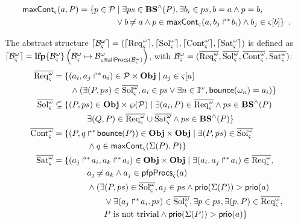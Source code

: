 \begin{definition}[$\gCont_\ctx : \Sigma \times \Obj \mapsto \powerset(\Proc)$]
  \label{def:maxCont}
  \begin{align*}
    \mathsf{maxCont}_\varsigma(a,P) = 
    \{ p \in \mathcal{P} &\mid \exists ps \in \mathbf{BS}^\wedge(P), \exists b_i \in ps, b = a \wedge p = b_i \\
      & \vee b \not\nobreak\mkern -2mu = a \wedge p \in \mathsf{maxCont}_\varsigma(a, \mbox{$b_j\Rsh^*\!b_i$}) \wedge b_j \in {\varsigma[b]} \}
    \enspace.
  \end{align*}
\end{definition}

\begin{definition}
  \label{def:aS}
  The abstract structure $\lceil \mathcal{B}_\varsigma^\omega\rceil=(\lceil \mathrm{Req}^\omega_\varsigma\rceil,\lceil \mathrm{Sol}^\omega_\varsigma\rceil,\lceil \mathrm{Cont}^\omega_\varsigma\rceil,\lceil \mathrm{Sat}^\omega_\varsigma\rceil)$ is defined as
  $
  \lceil \mathcal{B}_\varsigma^\omega\rceil = \mathbf{lfp}\{\mathcal{B}^\omega_\varsigma\}\left(\mathcal{B}^\omega_\varsigma\mapsto\mathcal{B}^\omega_{\varsigma \Cap \mathsf{allProcs}(\mathcal{B}^\omega_\varsigma)}\right)
  $,
  with $\mathcal{B}^\omega_\varsigma=(\overline{\mathrm{Req}^\omega_\varsigma},\overline{\mathrm{Sol}^\omega_\varsigma},\overline{\mathrm{Cont}^\omega_\varsigma},\overline{\mathrm{Sat}^\omega_\varsigma})$:
  \begin{align*}
    \myreq &= \{ (a_i,\PHobjp{a}{j}{i}) \in \PHproc \times \Obj \mid
      a_j \in \PHget{\ctx}{a} \\ %
      & \qquad \wedge (\exists (P,ps) \in \mysol, a_i \in ps \vee \exists n \in \indexes{\w}, \PHbounce(\w_n)=a_i) \}
    \\
    \mysol &\subseteq \{ (P,ps) \in \Obj \times \powerset(\PHproc) \mid
            \exists (a_i, P) \in \myreq \wedge ps \in \aBS(P) \\
      & \qquad\qquad \exists (Q, P) \in \myreq \cup \mysat \wedge ps \in \aBS(P) \}
    \\
    \mycont & = \{ (P, \PHobj{q}{\PHbounce(P)}) \in \Obj \times \Obj \mid
      \exists (P, ps) \in \mysol \\
      & \qquad\qquad \wedge q \in \gCont_\ctx(\PHsort(P),P) \}
    \\
    \mysat & = \{ (\PHobjp{a}{j}{i}, \PHobjp{a}{k}{i}) \in \Obj \times \Obj \mid
      \exists (a_i, \PHobjp{a}{j}{i}) \in \myreq, \\
      & \qquad\qquad a_j \neq a_k \wedge a_j \in \pfpprocs_\ctx(a) \\
      & \qquad\qquad \wedge (\exists (P, ps) \in \mysol, a_j \in ps \wedge \prio(\PHsort(P)) > \prio(a) \\
      & \qquad\qquad\qquad \vee \exists (\PHobjp{a}{j}{i}, ps) \in \mysol, \exists p \in ps, \exists (p, P) \in \myreq,\\
      & \qquad\qquad\qquad \text{$P$ is not trivial} \wedge \prio(\PHsort(P)) > \prio(a) \}
  \end{align*}
\end{definition}

